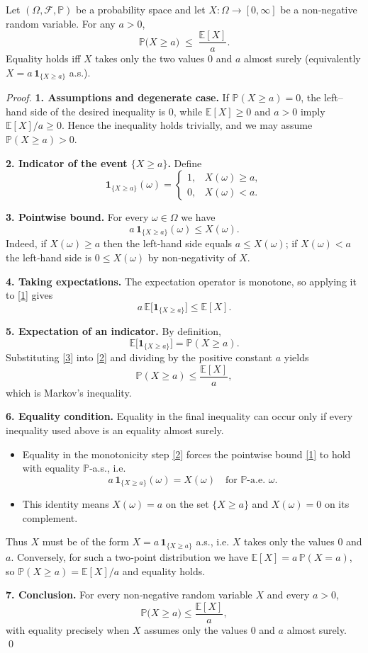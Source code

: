 \begin{theorem}
Let $(\Omega,\mathcal F,\mathbb P)$ be a probability space and let $X:\Omega\to[0,\infty]$ be a non‑negative random variable.  
For any $a>0$,
\[
\mathbb P\bigl(X\ge a\bigr)\;\le\;\frac{\mathbb E[X]}{a}.
\]
Equality holds iff $X$ takes only the two values $0$ and $a$ almost surely (equivalently $X=a\,\mathbf 1_{\{X\ge a\}}$ a.s.).
\end{theorem}

\begin{proof}
\textbf{1.  Assumptions and degenerate case.}  
If $\mathbb P(X\ge a)=0$, the left–hand side of the desired inequality is $0$, while $\mathbb E[X]\ge0$ and $a>0$ imply $\mathbb E[X]/a\ge0$. Hence the inequality holds trivially, and we may assume $\mathbb P(X\ge a)>0$.

\medskip\noindent\textbf{2.  Indicator of the event $\{X\ge a\}$.}  
Define
\[
\mathbf 1_{\{X\ge a\}}(\omega)=
\begin{cases}
1, & X(\omega)\ge a,\\[4pt]
0, & X(\omega)< a .
\end{cases}
\]

\medskip\noindent\textbf{3.  Pointwise bound.}  
For every $\omega\in\Omega$ we have
\[
a\,\mathbf 1_{\{X\ge a\}}(\omega)\le X(\omega).
\tag{1}
\]
Indeed, if $X(\omega)\ge a$ then the left‑hand side equals $a\le X(\omega)$; if $X(\omega)<a$ the left‑hand side is $0\le X(\omega)$ by non‑negativity of $X$.

\medskip\noindent\textbf{4.  Taking expectations.}  
The expectation operator is monotone, so applying it to \eqref{1} gives
\[
a\,\mathbb E\bigl[\mathbf 1_{\{X\ge a\}}\bigr]\le\mathbb E[X].
\tag{2}
\]

\medskip\noindent\textbf{5.  Expectation of an indicator.}  
By definition,
\[
\mathbb E\bigl[\mathbf 1_{\{X\ge a\}}\bigr]=\mathbb P(X\ge a).
\tag{3}
\]
Substituting \eqref{3} into \eqref{2} and dividing by the positive constant $a$ yields
\[
\mathbb P(X\ge a)\le\frac{\mathbb E[X]}{a},
\]
which is Markov’s inequality.

\medskip\noindent\textbf{6.  Equality condition.}  
Equality in the final inequality can occur only if every inequality used above is an equality almost surely.

\begin{itemize}
\item Equality in the monotonicity step \eqref{2} forces the pointwise bound \eqref{1} to hold with equality $\mathbb P$‑a.s., i.e.
\[
a\,\mathbf 1_{\{X\ge a\}}(\omega)=X(\omega)\quad\text{for $\mathbb P$‑a.e. }\omega .
\]
\item This identity means $X(\omega)=a$ on the set $\{X\ge a\}$ and $X(\omega)=0$ on its complement.
\end{itemize}
Thus $X$ must be of the form $X=a\,\mathbf 1_{\{X\ge a\}}$ a.s., i.e. $X$ takes only the values $0$ and $a$. Conversely, for such a two‑point distribution we have $\mathbb E[X]=a\,\mathbb P(X=a)$, so $\mathbb P(X\ge a)=\mathbb E[X]/a$ and equality holds.

\medskip\noindent\textbf{7.  Conclusion.}  
For every non‑negative random variable $X$ and every $a>0$,
\[
\mathbb P\bigl(X\ge a\bigr)\le\frac{\mathbb E[X]}{a},
\]
with equality precisely when $X$ assumes only the values $0$ and $a$ almost surely. \qed
\end{proof}